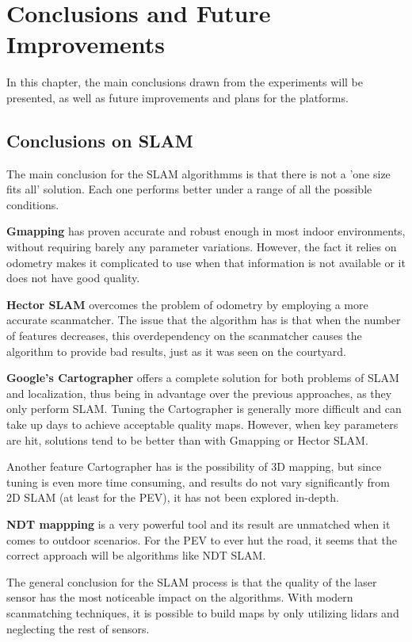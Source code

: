 
\chapter{Conclusions and Future Improvements}
\label{ch:conclusions}

In this chapter, the main conclusions drawn from the experiments will be presented, as well as future improvements and plans for the platforms.

\section{Conclusions on SLAM}

The main conclusion for the SLAM algorithmms is that there is not a 'one size fits all' solution. Each one performs better under a range of all the possible conditions.

\textbf{Gmapping} has proven accurate and robust enough in most indoor environments, without requiring barely any parameter variations. However, the fact it relies on odometry makes it complicated to use when that information is not available or it does not have good quality.

\textbf{Hector SLAM} overcomes the problem of odometry by employing a more accurate scanmatcher. The issue that the algorithm has is that when the number of features decreases, this overdependency on the scanmatcher causes the algorithm to provide bad results, just as it was seen on the courtyard.

\textbf{Google's Cartographer} offers a complete solution for both problems of SLAM and localization, thus being in advantage over the previous approaches, as they only perform SLAM. Tuning the Cartographer is generally more difficult and can take up days to achieve acceptable quality maps. However, when key parameters are hit, solutions tend to be better than with Gmapping or Hector SLAM.

Another feature Cartographer has is the possibility of 3D mapping, but since tuning is even more time consuming, and results do not vary significantly from 2D SLAM (at least for the PEV), it has not been explored in-depth.

\textbf{NDT mappping} is a very powerful tool and its result are unmatched when it comes to outdoor scenarios. For the PEV to ever hut the road, it seems that the correct approach will be algorithms like NDT SLAM.

The general conclusion for the SLAM process is that the quality of the laser sensor has the most noticeable impact on the algorithms. With modern scanmatching techniques, it is possible to build maps by only utilizing lidars and neglecting the rest of sensors. 

